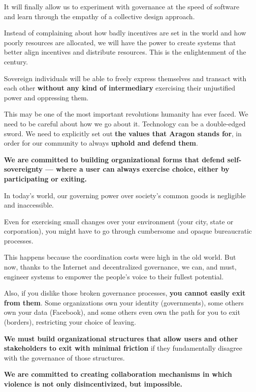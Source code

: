 It will finally allow us to experiment with governance at the speed of software and learn through the empathy of a collective design approach.

Instead of complaining about how badly incentives are set in the world and how poorly resources are allocated, we will have the power to create systems that better align incentives and distribute resources. This is the enlightenment of the century.

Sovereign individuals will be able to freely express themselves and transact with each other \textbf{without any kind of intermediary} exercising their unjustified power and oppressing them.

This may be one of the most important revolutions humanity has ever faced.
We need to be careful about how we go about it.
Technology can be a double-edged sword.
We need to explicitly set out \textbf{the values that Aragon stands for}, in order for our community to always \textbf{uphold and defend them}.

\textbf{We are committed to building organizational forms that defend self-sovereignty — where a user can always exercise choice, either by participating or exiting.}

In today's world, our governing power over society's common goods is negligible and inaccessible.

Even for exercising small changes over your environment (your city, state or corporation), you might have to go through cumbersome and opaque bureaucratic processes.

This happens because the coordination costs were high in the old world.
But now, thanks to the Internet and decentralized governance, we can, and must, engineer systems to empower the people's voice to their fullest potential.

Also, if you dislike those broken governance processes, \textbf{you cannot easily exit from them}.
Some organizations own your identity (governments), some others own your data (Facebook), and some others even own the path for you to exit (borders), restricting your choice of leaving.

\textbf{We must build organizational structures that allow users and other stakeholders to exit with minimal friction} if they fundamentally disagree with the governance of those structures.

\textbf{We are committed to creating collaboration mechanisms in which violence is not only disincentivized, but impossible.}

